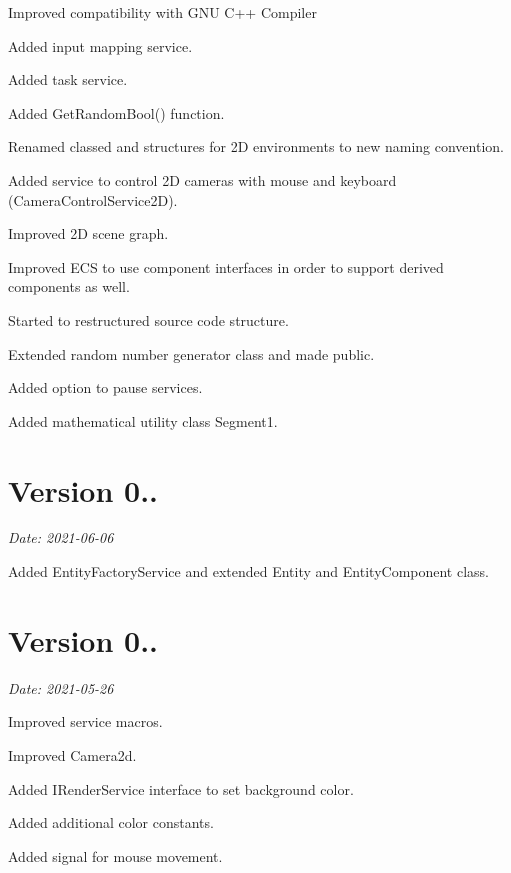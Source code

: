 \begin{DoxyItemize}
\item Improved compatibility with G\+NU C++ Compiler
\item Added input mapping service.
\item Added task service.
\item Added {\ttfamily Get\+Random\+Bool()} function.
\item Renamed classed and structures for 2D environments to new naming convention.
\item Added service to control 2D cameras with mouse and keyboard ({\ttfamily Camera\+Control\+Service2D}).
\item Improved 2D scene graph.
\item Improved E\+CS to use component interfaces in order to support derived components as well.
\item Started to restructured source code structure.
\item Extended random number generator class and made public.
\item Added option to pause services.
\item Added mathematical utility class {\ttfamily Segment1}.
\end{DoxyItemize}

\section*{Version 0..}

{\itshape Date\+: 2021-\/06-\/06}
\begin{DoxyItemize}
\item Added {\ttfamily Entity\+Factory\+Service} and extended {\ttfamily Entity} and {\ttfamily Entity\+Component} class.
\end{DoxyItemize}

\section*{Version 0..}

{\itshape Date\+: 2021-\/05-\/26}


\begin{DoxyItemize}
\item Improved service macros.
\item Improved Camera2d.
\item Added {\ttfamily I\+Render\+Service} interface to set background color.
\item Added additional color constants.
\item Added signal for mouse movement.
\end{DoxyItemize}

